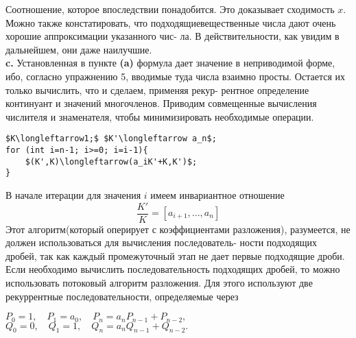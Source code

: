 \documentclass{mai_book}
\begin{document}
\noindent Соотношение, которое впоследствии понадобится. Это доказывает\linebreak 
схо­димость $x$. Можно также констатировать, что подходящие\linebreak веществен­ные числа дают очень хорошие аппроксимации указанного чис-\linebreak
ла. В действительности, как увидим в дальнейшем, они даже наилучшие.\newline
\\
\hspace*{15pt}\textbf{c.} Установленная в пункте \textbf{(a)} формула дает значение в неприводи­мой\linebreak 
форме, ибо, согласно упражнению 5, вводимые туда числа взаимно\linebreak
просты. Остается их только вычислить, что и сделаем, применяя рекур­-\linebreak
рентное определение континуант и значений многочленов. Приводим\linebreak
совмещенные вычисления числителя и знаменателя, чтобы\linebreak 
минимизи­ровать необходимые операции.
\begin{lstlisting}[mathescape=true]
$K\longleftarrow1;$ $K'\longleftarrow a_n$;
for (int i=n-1; i>=0; i=i-1){
	$(K',K)\longleftarrow(a_iK'+K,K')$;
}
\end{lstlisting}
В начале итерации для значения $i$ имеем инвариантное отношение
$$ \frac{K'}{K}=[a_{i+1},...,a_n] $$
\newpage
%
%
\noindent Этот алгоритм(который оперирует с коэффициентами разложения),\linebreak
разумеется, не должен использоваться для вычисления последователь-­\linebreak
ности подходящих дробей, так как каждый промежуточный этап не\linebreak
дает первые подходящие дроби.\newline
\hspace*{15pt}Если необходимо вычислить последовательность подходящих дро­бей,\linebreak
то можно использовать потоковый алгоритм разложения. Для это­го \linebreak
используют две рекуррентные последовательности, определяемые через\nolinebreak
\begin{center}
	$P_0=1,\quad P_1=a_0,\quad P_n=a_nP_{n-1}+P_{n-2},$\\
	$Q_0=0,\quad Q_1=1,\quad Q_n=a_nQ_{n-1}+Q_{n-2}.$
\end{center}
\end{document}
